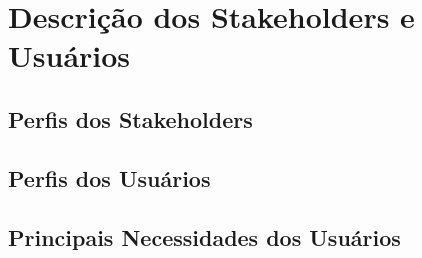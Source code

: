 \chapter{Descrição dos Stakeholders e Usuários}

\section{Perfis dos Stakeholders}
\section{Perfis dos Usuários}
\section{Principais Necessidades dos Usuários}